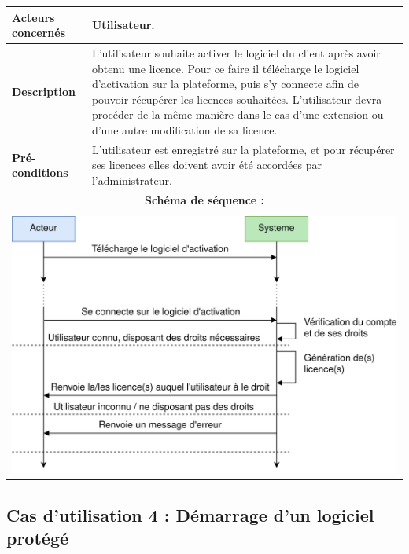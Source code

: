 \begin{table}[!h]
        \centering
        \begin{tabular}{| m{4cm} | m{12cm} |}
                \hline
		    \textbf{Acteurs concernés} & Utilisateur. \\
                \hline
		    \textbf{Description} & L'utilisateur souhaite activer le logiciel du client après avoir obtenu une licence. Pour ce faire il télécharge le logiciel d'activation sur la plateforme, puis s'y connecte afin de pouvoir récupérer les licences souhaitées.\newline
		    L'utilisateur devra procéder de la même manière dans le cas d'une extension ou d'une autre modification de sa licence.\\
                \hline
		    \textbf{Pré-conditions} & L'utilisateur est enregistré sur la plateforme, et pour récupérer ses licences elles doivent avoir été accordées par l'administrateur.\\
		\hline
		    \multicolumn{2}{|c|}{\textbf{Schéma de séquence :}} \\
                \hline
                    \multicolumn{2}{|c|}{}\\
                    \multicolumn{2}{|c|}{\includegraphics[width=15cm]{main/png/seq_activation.png}} \\
                \hline
        \end{tabular}
        \label{tab:tab3}
\end{table}
\newpage

\subsection{Cas d'utilisation 4 : Démarrage d'un logiciel protégé}


